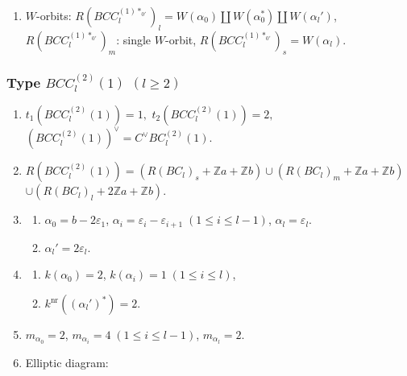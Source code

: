 \documentclass[11pt]{amsart}
\newcommand{\Z}{\mathbb{Z}}
\newcommand{\nr}{\mathrm{nr}}
\newcommand{\vep}{\varepsilon}
\begin{document}
{\begin{enumerate}
\begin{center}
{}
\end{center}
\item $W$-orbits: $R(BCC_l^{(1)\ast_{0'}})_l=W(\alpha_0) \amalg W(\alpha_0^\ast) \amalg
W(\alpha_l')$, \\
\phantom{$W$-orbits:} $R(BCC_l^{(1)\ast_{0'}})_m$: single $W$-orbit, \quad $R(BCC_l^{(1)\ast_{0'}})_s=W(\alpha_l)$.
\end{enumerate}

\subsubsection{Type $BCC_l^{(2)}(1)$ $(l\geq 2)$}\label{data:BCC-4}
\begin{enumerate}
\item $t_1(BCC_l^{(2)}(1))=1,$ \quad $t_2(BCC_l^{(2)}(1))=2,$ \quad $(BCC_l^{(2)}(1))^\vee = C^\vee BC_l^{(2)}(1).$
\item $R(BCC_l^{(2)}(1))=(R(BC_l)_s+\Z a+\Z b) \cup (R(BC_l)_m+\Z a+\Z b)$ \\
 $\cup (R(BC_l)_l+2\Z a+\Z b)$.
\item 
\begin{enumerate}
\item[i)] $\alpha_0=b-2\vep_1$, $\alpha_i=\vep_i-\vep_{i+1}\; 
(1\leq i\leq l-1)$, $\alpha_l=\vep_l$. 
\item[ii)] $\alpha_l'=2\vep_l$.
\end{enumerate}
\item 
\begin{enumerate}
\item[i)] $k(\alpha_0)=2$, \; $k(\alpha_i)=1\; (1\leq i\leq l)$, 
\item[ii)] $k^{\nr}((\alpha_l')^\ast)=2$. 
\end{enumerate}
\item $m_{\alpha_0}=2$, \; $m_{\alpha_i}=4\; 
(1\leq i\leq l-1)$, \; $m_{\alpha_l}=2$.
\item Elliptic diagram:




\begin{center}
\end{center}
\end{enumerate}}
\end{document}
